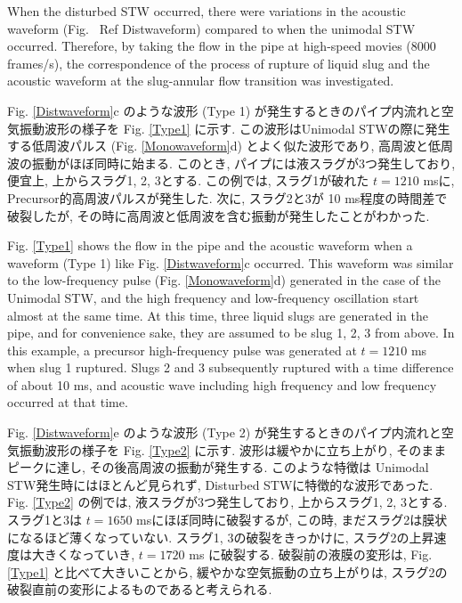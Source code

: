 \documentclass[12pt]{article}
\begin{document}
When the disturbed STW occurred, there were variations in the acoustic waveform (Fig. \ Ref {Distwaveform}) compared to when the unimodal STW occurred.
Therefore, by taking the flow in the pipe at high-speed movies (8000 frames/s), the correspondence of the process of rupture of liquid slug and the acoustic waveform at the slug-annular flow transition was investigated.

Fig. \ref{Distwaveform}c のような波形 (Type 1) が発生するときのパイプ内流れと空気振動波形の様子を Fig. \ref{Type1} に示す. 
この波形はUnimodal STWの際に発生する低周波パルス (Fig. \ref{Monowaveform}d) とよく似た波形であり, 高周波と低周波の振動がほぼ同時に始まる. 
このとき, パイプには液スラグが3つ発生しており, 便宜上, 上からスラグ1, 2, 3とする. 
この例では, スラグ1が破れた $t=1210$ msに, Precursor的高周波パルスが発生した. 
次に, スラグ2と3が 10 ms程度の時間差で破裂したが, その時に高周波と低周波を含む振動が発生したことがわかった.

Fig. \ref{Type1} shows the flow in the pipe and the acoustic waveform when a waveform (Type 1) like Fig. \ref {Distwaveform}c occurred.
This waveform was similar to the low-frequency pulse (Fig. \ref {Monowaveform}d) generated in the case of the Unimodal STW, and the high frequency and low-frequency oscillation start almost at the same time.
At this time, three liquid slugs are generated in the pipe, and for convenience sake, they are assumed to be slug 1, 2, 3 from above.
In this example, a precursor high-frequency pulse was generated at $t = 1210$ ms when slug 1 ruptured.
Slugs 2 and 3 subsequently ruptured with a time difference of about 10 ms, and acoustic wave including high frequency and low frequency occurred at that time.


Fig. \ref{Distwaveform}e のような波形 (Type 2) が発生するときのパイプ内流れと空気振動波形の様子を Fig. \ref{Type2} に示す. 
波形は緩やかに立ち上がり, そのままピークに達し, その後高周波の振動が発生する. 
このような特徴は Unimodal STW発生時にはほとんど見られず, Disturbed STWに特徴的な波形であった. 
Fig. \ref{Type2} の例では, 液スラグが3つ発生しており, 上からスラグ1, 2, 3とする. スラグ1と3は $t=1650$ msにほぼ同時に破裂するが, この時, まだスラグ2は膜状になるほど薄くなっていない. スラグ1, 3の破裂をきっかけに, スラグ2の上昇速度は大きくなっていき, $t=1720$ ms に破裂する. 破裂前の液膜の変形は, Fig. \ref{Type1} と比べて大きいことから, 緩やかな空気振動の立ち上がりは, スラグ2の破裂直前の変形によるものであると考えられる.
\end{document}
